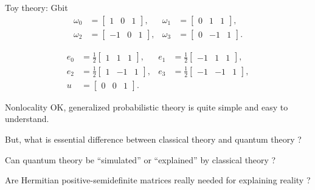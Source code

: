\documentclass{beamer}
\begin{document}
\begin{frame}{Toy theory: Gbit}
\vspace{-1em}
\begin{align*}
\omega_0&=\begin{bmatrix} 1& 0& 1\end{bmatrix},&
\omega_1&=\begin{bmatrix} 0& 1& 1\end{bmatrix},\\
\omega_2&=\begin{bmatrix} -1& 0& 1\end{bmatrix},&
\omega_3&=\begin{bmatrix} 0& -1& 1\end{bmatrix}.
\end{align*}

\vspace{-1em}
\begin{align*}
e_0&=\frac12\begin{bmatrix} 1& 1& 1\end{bmatrix},&
e_1&=\frac12\begin{bmatrix} -1& 1& 1\end{bmatrix},\\
e_2&=\frac12\begin{bmatrix} 1& -1& 1\end{bmatrix},&
e_3&=\frac12\begin{bmatrix} -1& -1& 1\end{bmatrix},\\
u&=\begin{bmatrix} 0& 0& 1\end{bmatrix}.
\end{align*}
\end{frame}

\begin{frame}{Nonlocality}
\centering
OK, generalized probabilistic theory is quite simple and easy to understand.

\vspace{2em}
But, what is essential difference between classical theory and quantum theory ?

\vspace{2em}
Can quantum theory be ``simulated'' or ``explained'' by classical theory ?

\vspace{2em}
Are Hermitian positive-semidefinite matrices really needed for explaining reality ?
\end{frame}

\end{document}
